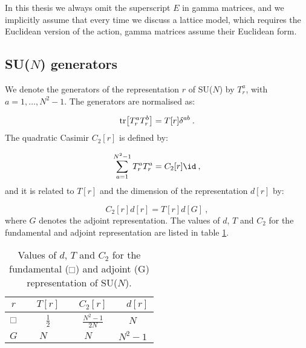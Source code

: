 In this thesis we always omit the superscript $E$ in gamma matrices, and we implicitly assume that every time we discuss a lattice model, which requires the Euclidean version of the action, gamma matrices assume their Euclidean form.

\subsection{SU($N$) generators}
\label{SUN_generators}

We denote the generators of the representation $r$ of SU($N$) by $T^a_r$, with $a = 1, \dots, N^2 -1$. The generators are normalised as:

\begin{equation}
\tr [T^a_r T^b_r] = T[r] \delta^{ab} \: .
\end{equation}
%
The quadratic Casimir $C_2[r]$ is defined by:

\begin{equation}
\sum_{a=1}^{N^2 -1} T^a_r T^a_r = C_2[r] \id \: ,
\end{equation}
%
and it is related to $T[r]$ and the dimension of the representation $d[r]$ by:

\begin{equation}
C_2[r] d[r] = T[r] d[G] \: ,
\end{equation}
%
where $G$ denotes the adjoint representation. The values of $d$, $T$ and $C_2$ for the fundamental and adjoint representation are listed in table \ref{group_factors}.

    \begin{table}
\begin{center}
    \begin{tabular}{c||ccc }
    $r$ & $ \quad T[r] $ & $\quad C_2[r] $ & $\quad d[r] $  \\
    \hline \hline
    $ \fund $ & $\quad \frac{1}{2}$ & $\quad\frac{N^2-1}{2N}$ &\quad $N$  \\
        $\text{$G$}$ &\quad $N$ &\quad $N$ &\quad $N^2-1$  \\
    \end{tabular}
    \end{center}
\caption{Values of $d$, $T$ and $C_2$ for the fundamental ($\fund$) and adjoint (G) representation of SU($N$).}
\label{group_factors}
    \end{table}



